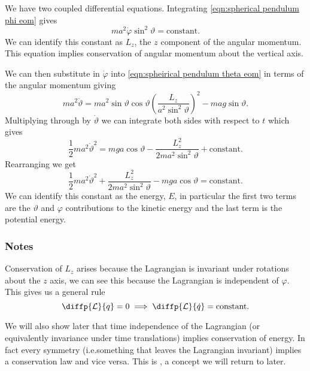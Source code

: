 \documentclass[fleqn]{NotesClass}
\newcommand*{\lagrangian}{\mathcal{L}}
\begin{document}
    We have two coupled differential equations.
    Integrating \cref{eqn:spherical pendulum phi eom} gives
    \begin{equation}
        ma^2\dot{\varphi}\sin^2\vartheta = \text{constant}.
    \end{equation}
    We can identify this constant as \(L_z\), the \(z\) component of the angular momentum.
    This equation implies conservation of angular momentum about the vertical axis.
    
    We can then substitute in \(\dot{\varphi}\) into \cref{eqn:spheirical pendulum theta eom} in terms of the angular momentum giving
    \begin{equation}
        ma^2\ddot{\vartheta} = ma^2\sin\vartheta\cos\vartheta \left( \frac{L_z}{a^2\sin^2\vartheta} \right)^2 - mag\sin\vartheta.
    \end{equation}
    Multiplying through by \(\dot{\vartheta}\) we can integrate both sides with respect to \(t\) which gives
    \begin{equation}
        \frac{1}{2}ma^2\dot{\vartheta}^2 = mga\cos\vartheta - \frac{L_z^2}{2ma^2\sin^2\vartheta} + \text{constant}.
    \end{equation}
    Rearranging we get
    \begin{equation}
        \frac{1}{2}ma^2\dot{\vartheta}^2 + \frac{L_z^2}{2ma^2\sin^2\vartheta} - mga\cos\vartheta = \text{constant}.
    \end{equation}
    We can identify this constant as the energy, \(E\), in particular the first two terms are the \(\vartheta\) and \(\varphi\) contributions to the kinetic energy and the last term is the potential energy.
    
    \subsubsection{Notes}
    Conservation of \(L_z\) arises because the Lagrangian is invariant under rotations about the \(z\) axis, we can see this because the Lagrangian is independent of \(\varphi\).
    This gives us a general rule
    \begin{equation}
        \diffp{\lagrangian}{q} = 0 \implies \diffp{\lagrangian}{\dot{q}} = \text{constant}.
    \end{equation}

    We will also show later that time independence of the Lagrangian (or equivalently invariance under time translations) implies conservation of energy.
    In fact every symmetry (i.e.\@ something that leaves the Lagrangian invariant) implies a conservation law and vice versa.
    This is , a concept we will return to later.
    
\end{document}
